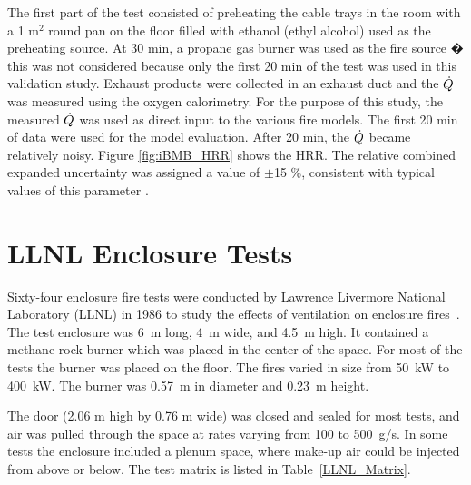 The first part of the test consisted of preheating the cable trays in the room with a 1 m$^2$ round pan on the floor filled with ethanol (ethyl alcohol) used as the preheating source.  At 30 min, a propane gas burner was used as the fire source � this was not considered because only the first 20 min of the test was used in this validation study.  
Exhaust products were collected in an exhaust duct and the $\dot{Q}$  was measured using the oxygen calorimetry.  For the purpose of this study, the measured $\dot{Q}$ was used as direct input to the various fire models.  The first 20 min of data were used for the model evaluation. After 20 min, the  $\dot{Q}$ became relatively noisy.  Figure \ref{fig:iBMB_HRR} shows the HRR. The relative combined expanded uncertainty was assigned a value of $\pm$15 \%, consistent with typical values of this parameter \cite{NRCNUREG1824Experimental}.

\section{LLNL Enclosure Tests}

Sixty-four enclosure fire tests were conducted by Lawrence Livermore National Laboratory (LLNL) in 1986 to study the effects of ventilation on enclosure fires~\cite{Foote:LLNL1986}. The test
enclosure was 6~m long, 4~m wide, and 4.5~m high. It contained a methane rock burner which was placed in the center of the space. For most of the tests the burner was placed on the
floor. The fires varied in size from 50~kW to 400~kW. The burner was 0.57~m in diameter and 0.23~m height.

The door (2.06 m high by 0.76 m wide) was closed and sealed for most tests, and air was pulled through the space at rates varying from 100 to 500~g/s. In some tests the enclosure included a plenum space, where
make-up air could be injected from above or below. The test matrix is listed in Table~\ref{LLNL_Matrix}.

